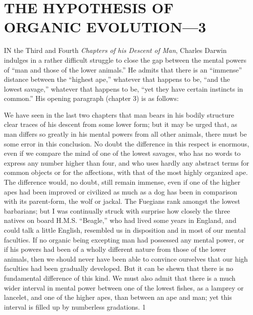 \chapter{THE HYPOTHESIS OF ORGANIC EVOLUTION—3}

IN the Third and Fourth \textit{Chapters of his Descent of Man}, Charles Darwin indulges in a rather
difficult struggle to close the gap between the mental powers of ``man and those of the lower
animals.'' He admits that there is an ``immense'' distance between the ``highest ape,'' whatever
that happens to be, ``and the lowest savage,'' whatever that happens to be, ``yet they have
certain instincts in common.'' His opening paragraph (chapter 3) is as follows:

We have seen in the last two chapters that man bears in his bodily structure clear traces of his
descent from some lower form; but it may be urged that, as man differs so greatly in his
mental powers from all other animals, there must be some error in this conclusion. No doubt
the difference in this respect is enormous, even if we compare the mind of one of the lowest
savages, who has no words to express any number higher than four, and who uses hardly any
abstract terms for common objects or for the affections, with that of the most highly
organized ape. The difference would, no doubt, still remain immense, even if one of the
higher apes had been improved or civilized as much as a dog has been in comparison with its
parent-form, the wolf or jackal. The Fuegians rank amongst the lowest barbarians; but I was
continually struck with surprise how closely the three natives on board H.M.S. ``Beagle,''
who had lived some years in England, and could talk a little English, resembled us in
disposition and in most of our mental faculties. If no organic being excepting man had
possessed any mental power, or if his powers had been of a wholly different nature from
those of the lower animals, then we should never have been able to convince ourselves that
our high faculties had been gradually developed. But it can be shewn that there is no
fundamental difference of this kind. We must also admit that there is a much wider interval
in mental power between one of the lowest fishes, as a lamprey or lancelet, and one of the
higher apes, than between an ape and man; yet this interval is filled up by numberless
gradations. 1

